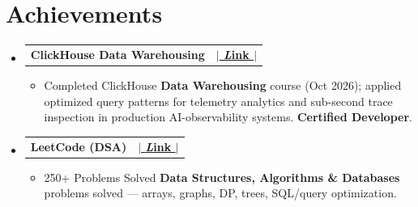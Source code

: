 \documentclass[letterpaper,10pt]{article}
\makeatletter
\newcommand{\resumeItem}[1]{
  \item\small{
    {#1 \vspace{-3pt}}
  }
}
\newcommand{\resumeProjectHeading}[2]{
    \item
    \begin{tabular*}{0.97\textwidth}{l@{\extracolsep{\fill}}r}
      \small#1 & #2 \\
    \end{tabular*}\vspace{-7pt}
}
\newcommand{\resumeSubHeadingListStart}{\begin{itemize}[leftmargin=0.15in, label={}]}
\newcommand{\resumeSubHeadingListEnd}{\end{itemize}}
\newcommand{\resumeItemListStart}{\begin{itemize}}
\newcommand{\resumeItemListEnd}{\end{itemize}\vspace{-4pt}}
\makeatother
\begin{document}
\section{Achievements}
  \resumeSubHeadingListStart
    \resumeProjectHeading
      {\textbf{ClickHouse Data Warehousing}}{\href{https://www.credly.com/earner/earned/badge/6a74a0b9-188c-4497-93d4-fc282e69f8fe}{\textbf{ $|$ \emph Link $|$}}}
      \resumeItemListStart
        \resumeItem{Completed ClickHouse \textbf{Data Warehousing} course (Oct 2026); applied optimized query patterns for telemetry analytics and sub-second trace inspection in production AI-observability systems. \textbf{Certified Developer}.}
      \resumeItemListEnd
    \resumeProjectHeading
      {\textbf{LeetCode (DSA)}}{\href{https://leetcode.com/u/adityadeshlahre/}{\textbf{ $|$ \emph Link $|$}}}
      \resumeItemListStart
        \resumeItem{250+ Problems Solved \textbf{Data Structures, Algorithms \& Databases} problems solved — arrays, graphs, DP, trees, SQL/query optimization.}
      \resumeItemListEnd
  \resumeSubHeadingListEnd



\end{document}

